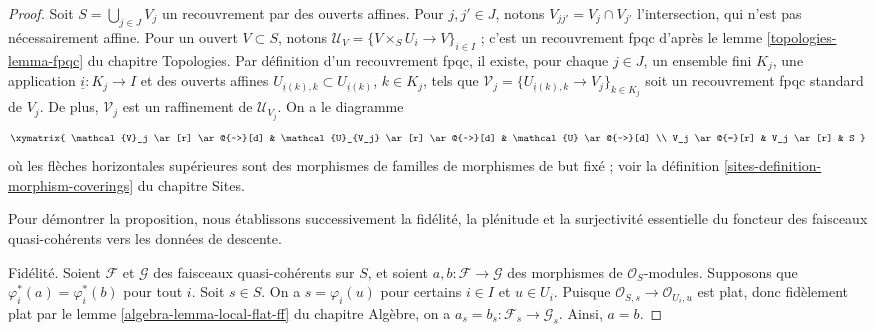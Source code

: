 \begin{proof}
Soit $S = \bigcup_{j \in J} V_j$ un recouvrement par des ouverts affines.
Pour $j, j' \in J$, notons $V_{jj'} = V_j \cap V_{j'}$
l'intersection, qui n'est pas nécessairement affine.
Pour un ouvert $V \subset S$, notons
$\mathcal{U}_V = \{V \times_S U_i \to V\}_{i \in I}$ ;
c'est un recouvrement fpqc d'après le lemme
\ref{topologies-lemma-fpqc} du chapitre Topologies.
Par définition d'un recouvrement fpqc, il existe, pour chaque $j \in J$,
un ensemble fini $K_j$, une application $\underline{i} : K_j \to I$
et des ouverts affines $U_{\underline{i}(k), k} \subset U_{\underline{i}(k)}$,
$k \in K_j$, tels que
$\mathcal{V}_j = \{U_{\underline{i}(k), k} \to V_j\}_{k \in K_j}$
soit un recouvrement fpqc standard de $V_j$.
De plus, $\mathcal{V}_j$ est un raffinement de $\mathcal{U}_{V_j}$.
On a le diagramme
$$
\xymatrix{
\mathcal{V}_j \ar[r] \ar@{~>}[d] &
\mathcal{U}_{V_j} \ar[r] \ar@{~>}[d] &
\mathcal{U} \ar@{~>}[d] \\
V_j \ar@{=}[r] & V_j \ar[r] & S
}
$$
où les flèches horizontales supérieures sont des morphismes de familles
de morphismes de but fixé ; voir la définition
\ref{sites-definition-morphism-coverings} du chapitre Sites.

\medskip\noindent
Pour démontrer la proposition, nous établissons successivement
la fidélité, la plénitude et la surjectivité essentielle
du foncteur des faisceaux quasi-cohérents vers les données de descente.

\medskip\noindent
Fidélité. Soient $\mathcal{F}$ et $\mathcal{G}$ des faisceaux quasi-cohérents
sur $S$, et soient $a, b : \mathcal{F} \to \mathcal{G}$
des morphismes de $\mathcal{O}_S$-modules.
Supposons que $\varphi_i^*(a) = \varphi_i^*(b)$ pour tout $i$.
Soit $s \in S$. On a $s = \varphi_i(u)$ pour certains $i \in I$
et $u \in U_i$.
Puisque $\mathcal{O}_{S, s} \to \mathcal{O}_{U_i, u}$ est plat,
donc fidèlement plat par le lemme \ref{algebra-lemma-local-flat-ff}
du chapitre Algèbre, on a
$a_s = b_s : \mathcal{F}_s \to \mathcal{G}_s$. Ainsi, $a = b$.


\end{proof}
